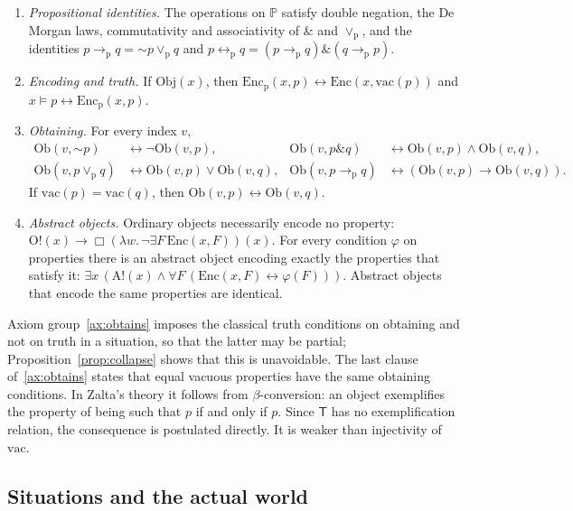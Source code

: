 \documentclass[11pt]{amsart}
\theoremstyle{plain}
\theoremstyle{definition}
\theoremstyle{remark}
\newcommand{\Obj}{\mathrm{Obj}}
\newcommand{\Enc}{\mathrm{Enc}}
\newcommand{\Encp}{\mathrm{Enc}_{\mathrm{p}}}
\newcommand{\Obt}{\mathrm{Ob}}
\newcommand{\VAC}{\mathrm{vac}}
\newcommand{\Ord}{\mathrm{O!}}
\newcommand{\Abs}{\mathrm{A!}}
\newcommand{\Prop}{\mathbb{P}}
\newcommand{\T}{\mathsf{T}}
\newcommand{\pneg}{\mathord{\sim}}
\newcommand{\pand}{\mathbin{\&}}
\newcommand{\por}{\mathbin{\vee_{\mathrm{p}}}}
\newcommand{\pimp}{\mathbin{\to_{\mathrm{p}}}}
\newcommand{\piff}{\mathbin{\leftrightarrow_{\mathrm{p}}}}
\begin{document}
\begin{enumerate}[label=(T\arabic*), leftmargin=3.2em]
\item \label{ax:boolean} \emph{Propositional identities.} The
  operations on $\Prop$ satisfy double negation, the De Morgan laws,
  commutativity and associativity of $\pand$ and $\por$, and the
  identities $p \pimp q = \pneg p \por q$ and
  $p \piff q = (p \pimp q) \pand (q \pimp p)$.
\item \label{ax:encoding} \emph{Encoding and truth.} If $\Obj(x)$, then
  $\Encp(x,p) \leftrightarrow \Enc(x, \VAC(p))$ and
  $x \models p \leftrightarrow \Encp(x,p)$.
\item \label{ax:obtains} \emph{Obtaining.} For every index $v$,
  \begin{align*}
    \Obt(v, \pneg p) &\leftrightarrow \neg\Obt(v,p), &
    \Obt(v, p \pand q) &\leftrightarrow \Obt(v,p) \wedge \Obt(v,q),\\
    \Obt(v, p \por q) &\leftrightarrow \Obt(v,p) \vee \Obt(v,q), &
    \Obt(v, p \pimp q) &\leftrightarrow (\Obt(v,p) \to \Obt(v,q)).
  \end{align*}
  If $\VAC(p) = \VAC(q)$, then $\Obt(v,p) \leftrightarrow \Obt(v,q)$.
\item \label{ax:abstract} \emph{Abstract objects.} Ordinary objects
  necessarily encode no property:
  $\Ord(x) \to \Box(\lambda w.\,\neg\exists F\,\Enc(x,F))(x)$. For
  every condition $\varphi$ on properties there is an abstract object
  encoding exactly the properties that satisfy it:
  $\exists x\,(\Abs(x) \wedge \forall F\,(\Enc(x,F) \leftrightarrow
  \varphi(F)))$. Abstract objects that encode the same properties are
  identical.
\end{enumerate}

Axiom group~\ref{ax:obtains} imposes the classical truth conditions on
obtaining and not on truth in a situation, so that the latter may be
partial; Proposition~\ref{prop:collapse} shows that this is
unavoidable. The last clause of~\ref{ax:obtains} states that equal
vacuous properties have the same obtaining conditions. In Zalta's theory
it follows from $\beta$-conversion: an object exemplifies the property
of being such that $p$ if and only if $p$. Since $\T$ has no
exemplification relation, the consequence is postulated directly. It is
weaker than injectivity of $\VAC$.

\subsection{Situations and the actual world}
\end{document}
